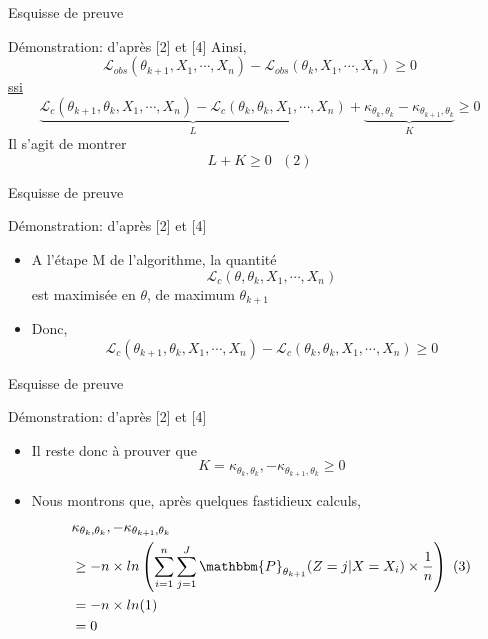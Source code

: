 \documentclass[11pt]{beamer}
\begin{document}
	\begin{frame}{Esquisse de preuve}
		\scriptsize
		\begin{block}{Démonstration: d'après [2] et [4]}
				Ainsi,
				\[
				\mathcal{L}_{obs}(\theta_{k+1}, X_1, \cdots, X_n) - \mathcal{L}_{obs}(\theta_k, X_1, \cdots, X_n) \geq 0
				\]
				\underline{ssi}
				\[
				\underbrace{\mathcal{L}_c(\theta_{k+1}, \theta_k, X_1, \cdots, X_n) - \mathcal{L}_c(\theta_k, \theta_k, X_1, \cdots, X_n)}_{L} + \underbrace{\kappa_{\theta_{k}, \theta_k}  - \kappa_{\theta_{k+1}, \theta_k}}_{K} \geq 0
				\]
Il s'agit de montrer 
				\[
			L + K \geq 0 \text{   } (2)
				\]
		\end{block}
	\end{frame}


	\begin{frame}{Esquisse de preuve}
		\begin{block}{Démonstration: d'après [2] et [4]}
			\begin{itemize}
				\item A l'étape M de l'algorithme, la quantité 
					\[
					\mathcal{L}_c(\theta, \theta_k, X_1, \cdots, X_n)
					\]
est maximisée en $\theta$, de maximum $\theta_{k+1}$
				\item Donc,
					\[
					\mathcal{L}_c(\theta_{k+1}, \theta_k, X_1, \cdots, X_n) - \mathcal{L}_c(\theta_k, \theta_k, X_1, \cdots, X_n) \geq 0
					\]
			\end{itemize}
		\end{block}
	\end{frame}

	\begin{frame}{Esquisse de preuve}
		\begin{block}{Démonstration: d'après [2] et [4]}
			\scriptsize
			\begin{itemize}
				\item Il reste donc à prouver que
					\[
					 K = \kappa_{\theta_{k}, \theta_k}, - \kappa_{\theta_{k+1}, \theta_k} \geq 0
					\]
				\item Nous montrons que, après quelques fastidieux calculs,
				\begin{align*}
					& \kappa_{\theta_{k}, \theta_k}, - \kappa_{\theta_{k+1}, \theta_k} \\
					& \geq - n\times ln\left( \sum_{i=1}^n\sum_{j=1}^J\mathbbm{P}_{\theta_{k+1}}(Z = j|X=X_i)\times\frac{1}{n}\right)  \text{  }  (3) \\
					&=  -n\times ln(1)\\
					&= 0
				\end{align*}
			\end{itemize}
		\end{block}
	\end{frame}
\end{document}
